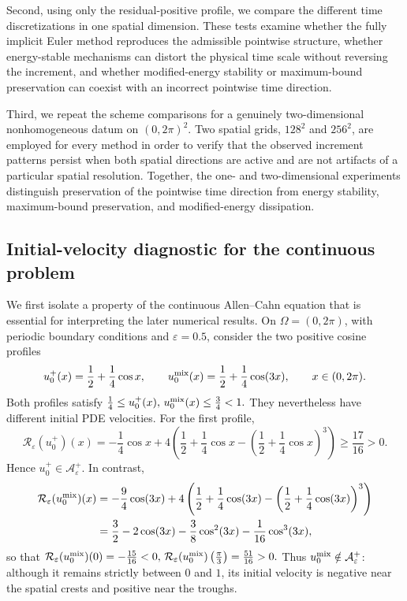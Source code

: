 \documentclass[final, 3p, times]{elsarticle}%
\newcommand{\eps}{\varepsilon}
\newcommand{\Reps}{\mathcal R_\varepsilon}
\newcommand{\Aepsp}{\mathcal A_\varepsilon^+}
\newcommand{\Aeps}{\Aepsp}
\begin{document}
Second, using only the residual-positive profile, we compare the different
time discretizations in one spatial dimension. These tests examine whether
the fully implicit Euler method reproduces the admissible pointwise structure,
whether energy-stable mechanisms can distort the physical time scale without
reversing the increment, and whether modified-energy stability or
maximum-bound preservation can coexist with an incorrect pointwise time
direction.

Third, we repeat the scheme comparisons for a genuinely two-dimensional
nonhomogeneous datum on $(0,2\pi)^2$. Two spatial grids, $128^2$ and $256^2$,
are employed for every method in order to verify that the observed increment
patterns persist when both spatial directions are active and are not artifacts
of a particular spatial resolution. Together, the one- and two-dimensional
experiments distinguish preservation of the pointwise time direction from
energy stability, maximum-bound preservation, and modified-energy
dissipation.

\subsection{Initial-velocity diagnostic for the continuous problem}
\label{subsec:continuous-initial-velocity}

We first isolate a property of the continuous Allen--Cahn equation that is
essential for interpreting the later numerical results. On
$\Omega=(0,2\pi)$, with periodic boundary conditions and $\eps=0.5$, consider
the two positive cosine profiles
\begin{equation}
    u_0^+(x)=\frac12+\frac14\cos x,
    \qquad
    u_0^{\rm mix}(x)=\frac12+\frac14\cos(3x),
    \qquad x\in(0,2\pi).
    \label{eq:numerical-initial-data-pair}
\end{equation}
Both profiles satisfy
$
    \frac14\leq u_0^+(x),\,u_0^{\rm mix}(x)\leq\frac34<1.
$
They nevertheless have different initial PDE velocities. For the first
profile,
\[
    \Reps(u_0^+)(x)
    =-\frac14\cos x+4\left(\frac12+\frac14\cos x
      -\left(\frac12+\frac14\cos x\right)^3\right)
    \geq \frac{17}{16}>0.
\]
Hence $u_0^+\in\Aeps$. In contrast,
\begin{align*}
    \Reps(u_0^{\rm mix})(x)
    &=-\frac94\cos(3x)+4\left(\frac12+\frac14\cos(3x)
      -\left(\frac12+\frac14\cos(3x)\right)^3\right) \\
    &=\frac32-2\cos(3x)-\frac38\cos^2(3x)-\frac1{16}\cos^3(3x),
\end{align*}
so that
$
    \Reps(u_0^{\rm mix})(0)=-\frac{15}{16}<0,
    \,
    \Reps(u_0^{\rm mix})\left(\frac{\pi}{3}\right)=\frac{51}{16}>0.
$
Thus $u_0^{\rm mix}\notin\Aeps$: although it remains strictly between $0$
and $1$, its initial velocity is negative near the spatial crests and positive
near the troughs.
\end{document}
